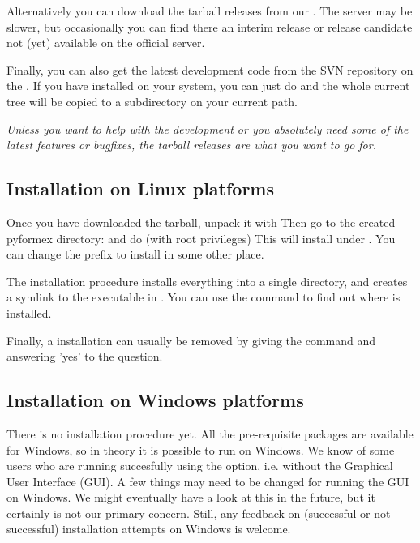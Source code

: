 Alternatively you can download the tarball releases from our . The server may be slower, but occasionally you can find there an interim release or release candidate not (yet) available on the official server.

Finally, you can also get the latest development code from the SVN repository on the . If you have  installed on your system, you can just do
and the whole current \pyformex tree will be copied to a subdirectory  on your current path.

\emph{Unless you want to help with the development or you absolutely need some of the latest features or bugfixes, the tarball releases are what you want to go for. 
}


\subsection{Installation on Linux platforms}
\label{sec:installation-linux}
Once you have downloaded the \pyformex tarball, unpack it with
Then go to the created pyformex directory:
and do (with root privileges) 
This will install \pyformex under . You can change the prefix to install in some other place.

The installation procedure installs everything into a single directory, and creates a symlink to the executable in .
You can use the command  to find out where \pyformex is installed. 

Finally, a \pyformex installation can usually be removed by giving the command  and answering 'yes' to the question.


\subsection{Installation on Windows platforms}
\label{sec:installation-windows}
There is no installation procedure yet. All the pre-requisite packages are available for Windows, so in theory it is possible to run \pyformex on Windows. We know of some users who are running \pyformex succesfully using the  option, i.e. without the Graphical User Interface (GUI).  
A few things may need to be changed for running the GUI on Windows. We might eventually have a look at this in the future, but it certainly is not our primary concern.
Still, any feedback on (successful or not successful) installation attempts on Windows is welcome.


